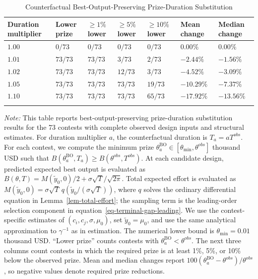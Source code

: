\documentclass[mnsc]{informs3}
\begin{document}
\begin{table}[htbp]
\centering
\caption{Counterfactual Best-Output-Preserving Prize-Duration Substitution}
\label{tab-counterfactual-policy}
\scriptsize
\begin{tabularx}{\textwidth}{lYYYYYY}
\toprule
\textbf{Duration multiplier} & \textbf{Lower prize} & \textbf{$\geq1\%$ lower} & \textbf{$\geq5\%$ lower} & \textbf{$\geq10\%$ lower} & \textbf{Mean change} & \textbf{Median change} \\
\midrule
$1.00$ & $0/73$ & $0/73$ & $0/73$ & $0/73$ & $0.00\%$ & $0.00\%$ \\
$1.01$ & $73/73$ & $73/73$ & $3/73$ & $2/73$ & $-2.44\%$ & $-1.56\%$ \\
$1.02$ & $73/73$ & $73/73$ & $12/73$ & $3/73$ & $-4.52\%$ & $-3.09\%$ \\
$1.05$ & $73/73$ & $73/73$ & $73/73$ & $19/73$ & $-10.29\%$ & $-7.37\%$ \\
$1.10$ & $73/73$ & $73/73$ & $73/73$ & $65/73$ & $-17.92\%$ & $-13.56\%$ \\
\bottomrule
\addlinespace[0.5ex]
\end{tabularx}
\begin{minipage}{\textwidth}
{\footnotesize
\textit{Note:}
This table reports best-output-preserving prize-duration substitution results for the 73 contests with complete observed design inputs and structural estimates.
For duration multiplier $a$, the counterfactual duration is $T_a=aT^{obs}$.
For each contest, we compute the minimum prize $\theta_a^{\mathrm{BO}}\in[\theta_{\min},\theta^{obs}]$ thousand USD such that $B(\theta_a^{\mathrm{BO}},T_a)\geq B(\theta^{obs},T^{obs})$. At each candidate design, predicted expected best output is evaluated as $B(\theta,T)=M(\tilde y_0,0)/2+\sigma\sqrt T/\sqrt{2\pi}$. Total expected effort is evaluated as $M(\tilde y_0,0)=\sigma\sqrt{T}\,q(\tilde y_0/(\sigma\sqrt{T}))$, where $q$ solves the ordinary differential equation in Lemma~\ref{lem-total-effort}; the sampling term is the leading-order selection component in equation~\eqref{eq-terminal-gap-leading}. We use the contest-specific estimates of $(c_i,c_j,\sigma,\mu_0)$, set $\tilde y_0=\mu_0$, and use the same analytical approximation to $\gamma^{-1}$ as in estimation. The numerical lower bound is $\theta_{\min}=0.01$ thousand USD.
``Lower prize'' counts contests with $\theta_a^{\mathrm{BO}}<\theta^{obs}$.
The next three columns count contests in which the required prize is at least 1\%, 5\%, or 10\% below the observed prize.
Mean and median changes report $100(\theta_a^{\mathrm{BO}}-\theta^{obs})/\theta^{obs}$, so negative values denote required prize reductions.
}
\end{minipage}
\end{table}
\end{document}

